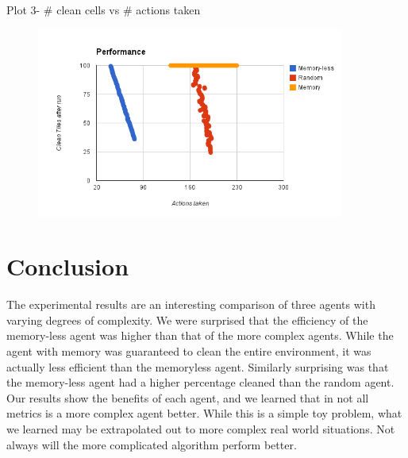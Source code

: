 \documentclass[a4paper,10pt]{article}
\begin{document}
Plot 3- \# clean cells vs \# actions taken
\begin{figure}[H]
	\includegraphics[width=0.9\textwidth]{image2.png}
\end{figure}

\section{Conclusion}
The experimental results are an interesting comparison of three agents with varying degrees of complexity.
We were surprised that the efficiency of the memory-less agent was higher than that of the more complex agents.
While the agent with memory was guaranteed to clean the entire environment, it was actually less efficient than the memoryless agent.
Similarly surprising was that the memory-less agent had a higher percentage cleaned than the random agent.
Our results show the benefits of each agent, and we learned that in not all metrics is a more complex agent better.
While this is a simple toy problem, what we learned may be extrapolated out to more complex real world situations.
Not always will the more complicated algorithm perform better.


\end{document}
